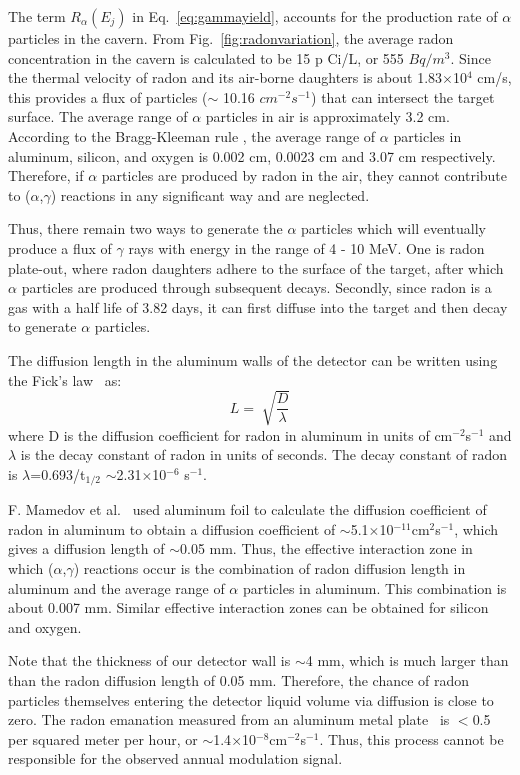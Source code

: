 \documentclass[aps,prc,showpacs,twocolumn,superscriptaddress]{revtex4-1}
\begin{document}
The term $R_{\alpha}(E_{j})$ in Eq.~\ref{eq:gammayield}, accounts for the production rate of $\alpha$ particles in the cavern. From Fig.~\ref{fig:radonvariation}, the average radon concentration in the cavern is calculated to be 15 p Ci/L, or 555 $Bq/m^{3}$. 
Since the thermal velocity of radon and its air-borne daughters is about 1.83$\times$10$^{4}$ cm/s, this provides a flux of particles ($\sim$ 10.16 $cm^{-2}s^{-1}$) that can intersect the target surface. The average range of $\alpha$ particles in air is approximately 3.2 cm. According to the Bragg-Kleeman rule \cite{bragg-kleeman}, the average range of  $\alpha$ particles in aluminum, silicon, and oxygen is 0.002 cm, 0.0023 cm and 3.07 cm respectively. Therefore, if $\alpha$ particles are produced by radon in the air, they cannot contribute to ($\alpha$,$\gamma$) reactions in any significant way and are neglected.   

Thus, there remain two ways to generate the $\alpha$ particles which will eventually produce a flux of $\gamma$ rays with energy in the range of 4 - 10 MeV. One is radon plate-out, where radon daughters adhere to the surface of the target, after which $\alpha$ particles are produced through subsequent decays. Secondly, since radon is a gas with a half life of 3.82 days, it can first diffuse into the target and then decay to generate $\alpha$ particles.  
 
The diffusion length in the aluminum walls of the detector can be written using the Fick's law~\cite{fick, ishimori} as: 
\begin{equation}
L=\sqrt[]{\frac{D}{\lambda}}
\label{ficks}
\end{equation}
where D is the diffusion coefficient for radon in aluminum in units of cm$^{-2}$s$^{-1}$ and $\lambda$ is the decay constant of radon in units of seconds. The decay constant of radon is $\lambda$=0.693/t$_{1/2}$ $\sim$2.31$\times$10$^{-6}$ s$^{-1}$. 

F. Mamedov et al.~\cite{fick} used aluminum foil to calculate the diffusion coefficient of radon in aluminum to obtain a diffusion coefficient of $\sim$5.1$\times$10$^{-11}$cm$^{2}$s$^{-1}$, which gives a diffusion length of $\sim$0.05 mm. Thus, the effective interaction zone in which ($\alpha$,$\gamma$) reactions occur is the combination of radon diffusion length in aluminum and the average range of $\alpha$ particles in aluminum. This combination is about 0.007 mm.  Similar effective interaction zones can be obtained for silicon and oxygen. 
 
Note that the thickness of our detector wall is $\sim$4 mm, which is much larger than than the radon diffusion length of 0.05 mm. Therefore, the chance of radon particles themselves entering the detector liquid volume via diffusion is close to zero.  The radon emanation measured from an aluminum metal plate~\cite{radon-emanation} is $<$0.5 per squared meter per hour, or $\sim$1.4$\times$10$^{-8}$cm$^{-2}$s$^{-1}$. Thus, this process cannot be responsible for the observed annual modulation signal.
\end{document}
